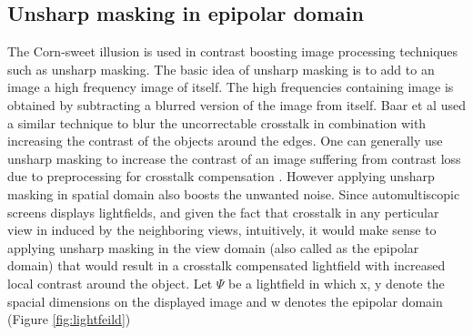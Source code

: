 \subsection{Unsharp masking in epipolar domain}
The Corn-sweet illusion \cite{ wiki:cornsweet} is used in contrast boosting image processing techniques such as unsharp masking. The basic idea of unsharp masking is to add to an image a high frequency image of itself. The high frequencies containing image is obtained by subtracting a blurred version of the image from itself. Baar et al \cite{van2011perceptually} used a similar technique to blur the uncorrectable crosstalk in combination with increasing the contrast of the objects around the edges. One can generally use unsharp masking to increase the contrast of an image suffering from contrast loss due to preprocessing for crosstalk compensation . However applying unsharp masking in spatial domain also boosts the unwanted noise. Since automultiscopic screens displays lightfields, and given the fact that crosstalk in any perticular view in induced by the neighboring views, intuitively, it would make sense to applying unsharp masking in the view domain (also called as the epipolar domain) that would result in a crosstalk compensated lightfield with increased local contrast around the object. Let $\Psi$ be a lightfield in which x, y denote the spacial dimensions on the displayed image and w denotes the epipolar domain (Figure \ref{fig:lightfeild})
